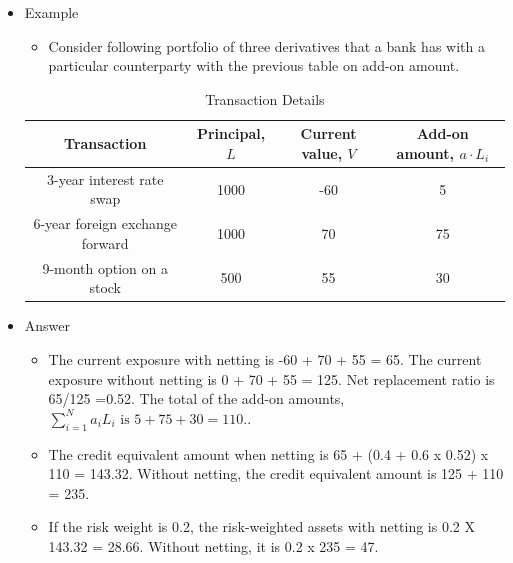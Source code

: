 \begin{itemize}
\item Example
    \begin{itemize}
    \item Consider following portfolio of three derivatives that a bank has with a particular counterparty with the previous table on add-on amount.
    \end{itemize}
    \begin{table}[h]
        \centering
        \caption{Transaction Details}
        \renewcommand{\arraystretch}{1.5} %
        \begin{tabular}{|c|c|c|c|}
            \hline
            \textbf{Transaction} & \textbf{Principal, \(L\)} & \textbf{Current value, \(V\)} & \textbf{Add-on amount, \(a \cdot L_i\)} \\
            \hline
            3-year interest rate swap & 1000 & -60 & 5 \\
            \hline
            6-year foreign exchange forward & 1000 & 70 & 75 \\
            \hline
            9-month option on a stock & 500 & 55 & 30 \\
            \hline
        \end{tabular}
    \end{table}

\item Answer
    \begin{itemize}
    \item The current exposure with netting is -60 + 70 + 55 = 65. The current exposure without netting is 0 + 70 + 55 = 125. Net replacement ratio is 65/125 =0.52. The total of the add-on amounts, \(\sum_{i=1}^{N} a_i L_i \text{ is } 5 + 75 + 30 = 110.\).
    \item The credit equivalent amount when netting is 65 + (0.4 + 0.6 x 0.52) x 110 = 143.32. Without netting, the credit equivalent amount is 125 + 110 = 235.
    \item If the risk weight is 0.2, the risk-weighted assets with netting is 0.2 X 143.32 = 28.66. Without netting, it is 0.2 x 235 = 47.
    \end{itemize}
\end{itemize}




